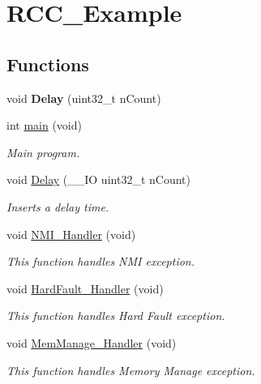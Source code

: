 \hypertarget{group___r_c_c___example}{\section{R\-C\-C\-\_\-\-Example}
\label{group___r_c_c___example}
}
\subsection*{Functions}
\begin{DoxyCompactItemize}
\item 
\hypertarget{group___r_c_c___example_gac388b72ecb8f9066b84a9f3af18fc30f}{void {\bfseries Delay} (uint32\-\_\-t n\-Count)}\label{group___r_c_c___example_gac388b72ecb8f9066b84a9f3af18fc30f}

\item 
int \hyperlink{group___r_c_c___example_ga840291bc02cba5474a4cb46a9b9566fe}{main} (void)
\begin{DoxyCompactList}\small\item\em Main program. \end{DoxyCompactList}\item 
void \hyperlink{group___r_c_c___example_ga5e013ec17dbb806bfe939dcbf980670d}{Delay} (\-\_\-\-\_\-\-I\-O uint32\-\_\-t n\-Count)
\begin{DoxyCompactList}\small\item\em Inserts a delay time. \end{DoxyCompactList}\item 
void \hyperlink{group___r_c_c___example_ga6ad7a5e3ee69cb6db6a6b9111ba898bc}{N\-M\-I\-\_\-\-Handler} (void)
\begin{DoxyCompactList}\small\item\em This function handles N\-M\-I exception. \end{DoxyCompactList}\item 
void \hyperlink{group___r_c_c___example_ga2bffc10d5bd4106753b7c30e86903bea}{Hard\-Fault\-\_\-\-Handler} (void)
\begin{DoxyCompactList}\small\item\em This function handles Hard Fault exception. \end{DoxyCompactList}\item 
void \hyperlink{group___r_c_c___example_ga3150f74512510287a942624aa9b44cc5}{Mem\-Manage\-\_\-\-Handler} (void)
\begin{DoxyCompactList}\small\item\em This function handles Memory Manage exception. \end{DoxyCompactList}\item 

\end{DoxyCompactItemize}
